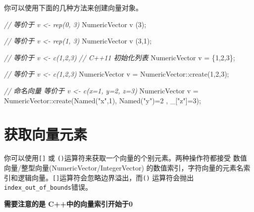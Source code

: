 \documentclass[]{ctexbook}
\newenvironment{Shaded}{\begin{snugshade}}{\end{snugshade}}
\newcommand{\DecValTok}[1]{\textcolor[rgb]{0.00,0.00,0.81}{#1}}
\newcommand{\StringTok}[1]{\textcolor[rgb]{0.31,0.60,0.02}{#1}}
\newcommand{\CommentTok}[1]{\textcolor[rgb]{0.56,0.35,0.01}{\textit{#1}}}
\newcommand{\NormalTok}[1]{#1}
\begin{document}
你可以使用下面的几种方法来创建向量对象。

\begin{Shaded}
\begin{Highlighting}[]
\CommentTok{// 等价于 v <- rep(0, 3)}
\NormalTok{NumericVector v (}\DecValTok{3}\NormalTok{);}

\CommentTok{// 等价于 v <- rep(1, 3)}
\NormalTok{NumericVector v (}\DecValTok{3}\NormalTok{,}\DecValTok{1}\NormalTok{);}

\CommentTok{// 等价于 v <- c(1,2,3) }
\CommentTok{// C++11 初始化列表}
\NormalTok{NumericVector v = \{}\DecValTok{1}\NormalTok{,}\DecValTok{2}\NormalTok{,}\DecValTok{3}\NormalTok{\}; }

\CommentTok{// 等价于 v <- c(1,2,3)}
\NormalTok{NumericVector v = NumericVector::create(}\DecValTok{1}\NormalTok{,}\DecValTok{2}\NormalTok{,}\DecValTok{3}\NormalTok{);}

\CommentTok{// 命名向量 等价于 v <- c(x=1, y=2, z=3)}
\NormalTok{NumericVector v =}
\NormalTok{  NumericVector::create(Named(}\StringTok{"x"}\NormalTok{,}\DecValTok{1}\NormalTok{), Named(}\StringTok{"y"}\NormalTok{)=}\DecValTok{2}\NormalTok{ , _[}\StringTok{"z"}\NormalTok{]=}\DecValTok{3}\NormalTok{);}
\end{Highlighting}
\end{Shaded}

\section{获取向量元素}\label{Accessing-vector-elements}

你可以使用\texttt{{[}{]}} 或
\texttt{()}运算符来获取一个向量的个别元素。两种操作符都接受
数值向量/整型向量(NumericVector/IntegerVector)
的数值索引，字符向量的元素名索引和逻辑向量。\texttt{{[}{]}}运算符会忽略边界溢出，而\texttt{()}
运算符会抛出\texttt{index\_out\_of\_bounds}错误。

\textbf{需要注意的是 C++中的向量索引开始于0}
\end{document}
